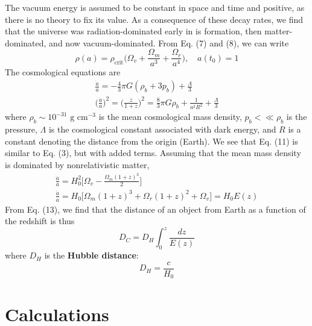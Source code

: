 \documentclass{article}
\begin{document}
The vacuum energy is assumed to be constant in space and time and positive, as there is no theory to fix its value. As a consequence of these decay rates, we find that the universe was radiation-dominated early in is formation, then matter-dominated, and now vacuum-dominated. From Eq. (7) and (8), we can write 
\begin{equation}
    \rho(a) = \rho_\text{crit} \Big( \Omega_v + \frac{\Omega_m}{a^3} + \frac{\Omega_r}{a^4} \Big), \quad a(t_0) = 1
\end{equation}
The cosmological equations are 
\begin{gather}
    \frac{\ddot{a}}{a} = -\frac{4}{3} \pi G(\rho_b + 3p_b) + \frac{\Lambda}{3} \\
    \Big(\frac{\dot{a}}{a} \Big)^2 = \Big( \frac{\dot{z}}{1+z} \Big)^2 = \frac{8}{3} \pi G \rho_b + \frac{1}{a^2 R^2} + \frac{\Lambda}{3}
\end{gather}
where $\rho_b \sim 10^{-31} \text{ g cm}^{-3}$ is the mean cosmological mass density, $p_b <\ll \rho_b$ is the pressure, $\Lambda$ is the cosmological constant associated with dark energy, and $R$ is a constant denoting the distance from the origin (Earth). We see that Eq. (11) is similar to Eq. (3), but with added terms. Assuming that the mean mass density is dominated by nonrelativistic matter, 
\begin{gather}
    \frac{\ddot{a}}{a} = H_0^2 \Big[ \Omega_v - \frac{\Omega_m (1+z)^3}{2} \Big] \\
    \frac{\dot{a}}{a} = H_0 \Big[ \Omega_m (1+z)^3 + \Omega_r (1+z)^2 + \Omega_v \Big] = H_0 E(z)
\end{gather}
From Eq. (13), we find that the distance of an object from Earth as a function of the redshift is thus 
\begin{equation}
    D_C = D_H \int_0^z \frac{dz}{E(z)}
\end{equation}
where $D_H$ is the \textbf{Hubble distance}: 
\begin{equation}
    D_H = \frac{c}{H_0}
\end{equation}

\section{Calculations}
\end{document}
